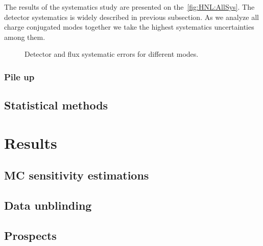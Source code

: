 \documentclass[../main.tex]{subfiles}
\begin{document}
The results of the systematics study are presented on the~\autoref{fig:HNL:AllSys}. The detector systematics is widely described in previous subsection. As we analyze all charge conjugated modes together we take the highest systematics uncertainties among them.

\begin{figure}[!ht]
    \begin{center}
    \begin{minipage}{0.49\linewidth}
    \end{minipage}
    \hfill
    \begin{minipage}{0.49\linewidth}
    \end{minipage}
    \vfill
    \begin{minipage}{0.49\linewidth}
    \end{minipage}
    \caption{Detector and flux systematic errors for different modes.}
    \label{fig:HNL:AllSys}
        \end{center}
\end{figure}



\subsection{Pile up}

\section{Statistical methods}
\label{sec:HNL:stat}


\chapter{Results}
\section{MC sensitivity estimations}

\section{Data unblinding}

\section{Prospects}
\end{document}
